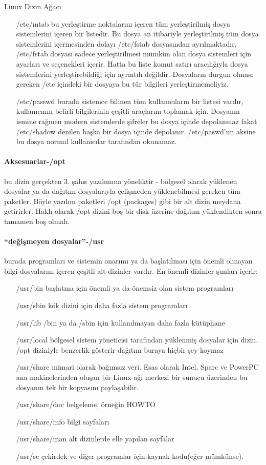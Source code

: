 \begin{section}{Linux Dizin Ağacı}
\begin{itemize}
\item[/etc/mtab]bu yerleştirme noktalarını içeren tüm yerleştirilmiş dosya sistemlerini içeren bir listedir. Bu dosya an itibariyle yerleştirilmiş tüm dosya sistemlerini içermesinden dolayı /etc/fstab dosyasından ayrılmaktadır, /etc/fstab dosyası sadece yerleştirilmesi mümkün olan dosya sistemleri için ayarları ve seçenekleri içerir. Hatta bu liste komut satırı aracılığıyla dosya sistemlerini yerleştirebildiği için ayrıntılı değildir.
Dosyaların durgun olması gereken /etc içindeki bir dosyaya bu tür bilgileri yerleştirmemeliyiz.
\item[/etc/passwd]burada sistemce bilinen tüm kullanıcıların bir listesi vardır, kullanıcının belirli bilgilerinin çeşitli araçlarını toplamak için. Dosyanın ismine rağmen modern sistemlerde şifreler bu dosya içinde depolanmaz fakat /etc/shadow denilen başka bir dosya içinde depolanır. /etc/paswd’un aksine bu dosya normal kullanıcılar tarafından okunamaz.
\end{itemize}

\paragraph{Aksesuarlar-/opt}{ bu dizin gerçekten 3. şahıs yazılımına yöneliktir - bölgesel olarak yüklenen dosyalar ya da dağıtım dosyalarıyla çelişmeden yüklenebilmesi gereken tüm paketler. Böyle yazılım paketleri /opt (packages)  gibi bir alt dizin meydana getirirler. Haklı olarak /opt dizini boş bir disk üzerine dağıtım yüklendikten sonra tamamen boş olmalı.}

\paragraph{“değişmeyen dosyalar”-/usr}{burada programları ve sistemin onarımı ya da başlatılması için önemli olmayan bilgi dosyalarını içeren çeşitli alt dizinler vardır. En önemli dizinler şunları içerir:}
\begin{itemize}
\item[/usr/bin] başlatma için önemli ya da önemsiz olan sistem programları
\item[/usr/sbin] kök dizini için daha fazla sistem programları
\item[/usr/lib] /bin ya da /sbin için kullanılmayan daha fazla kütüphane
\item[/usr/local] bölgesel sistem yöneticisi tarafından yüklenmiş dosyalar için dizin. /opt diziniyle benzerlik gösterir-dağıtım buraya hiçbir şey koymaz
\item[/usr/share]mimari olarak bağımsız veri. Esas olarak Intel, Sparc ve PowerPC ana makinelerinden oluşan bir Linux ağı merkezi bir sunucu üzerinden bu dosyanın tek bir kopyasını paylaşabilir.
\item[/usr/share/doc]belgeleme, örneğin HOWTO
\item[/usr/share/info]bilgi sayfaları
\item[/usr/share/man]alt dizinlerde elle yapılan sayfalar
\item[/usr/sc]çekirdek ve diğer programlar için kaynak kodu(eğer mümkünse).
\end{itemize}


\end{section}
